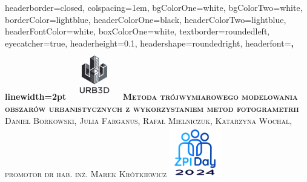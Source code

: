 \documentclass[landscape,a1paper,fontscale=0.45]{baposter} %
\begin{document}
\begin{poster}
{
headerborder=closed, %
colspacing=1em, %
bgColorOne=white, %
bgColorTwo=white, %
borderColor=lightblue, %
headerColorOne=black, %
headerColorTwo=lightblue, %
headerFontColor=white, %
boxColorOne=white, %
textborder=roundedleft, %
eyecatcher=true, %
headerheight=0.1\textheight, %
headershape=roundedright, %
headerfont=\Large\bf\textsc, %
linewidth=2pt %
}
%
{\includegraphics[height=6em]{images/logo_white.png}} %
{\bf\textsc{Metoda trójwymiarowego modelowania obszarów urbanistycznych z wykorzystaniem metod fotogrametrii}\vspace{0.5em}} %
{\textsc{Daniel Borkowski, Julia Farganus, Rafał Mielniczuk, Katarzyna Wochal, promotor dr hab. inż. Marek Krótkiewicz}}
{\includegraphics[height=6em]{images/zpi-logo.png}} %


\end{poster}
\end{document}

